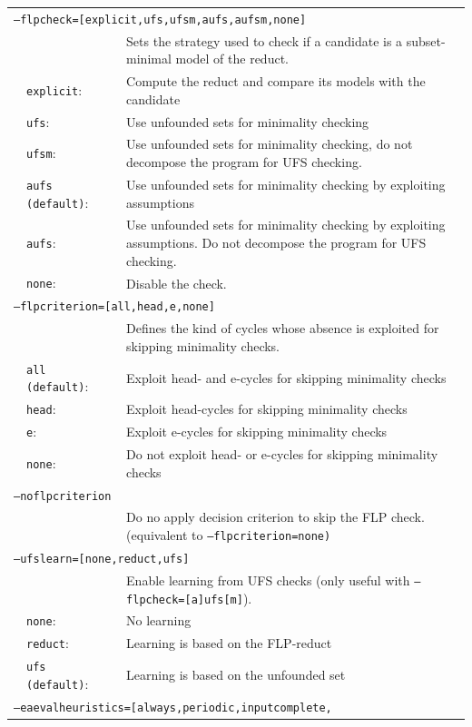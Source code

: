 \documentclass[a4paper, titlepage]{article}
\begin{document}
\begin{center}
\begin{longtable}{p{0.7cm}  p{2.2cm} p{0.3cm} p{6.3cm}  }
\multicolumn{4}{l}{\texttt{--flpcheck=[explicit,ufs,ufsm,aufs,aufsm,none]}}\\
& & &Sets the strategy used to check if a candidate is a subset-minimal model of the reduct.\\
&\texttt{explicit}:&&Compute the reduct and compare its models with the candidate\\
&\texttt{ufs}:&&Use unfounded sets for minimality checking
\\
&\texttt{ufsm}:&&Use unfounded sets for minimality checking, do not decompose the program for UFS checking.\\
&\texttt{aufs (default)}:&&Use unfounded sets for minimality checking by exploiting assumptions\\
&\texttt{aufs}:&&Use unfounded sets for minimality checking by exploiting assumptions. Do not decompose the program for UFS checking.\\
&\texttt{none}:&&Disable the check.\\
\multicolumn{4}{l}{\texttt{--flpcriterion=[all,head,e,none]}}\\
& & & Defines the kind of cycles whose absence is exploited for skipping minimality checks.\\
&\texttt{all (default)}:&&Exploit head- and e-cycles for skipping minimality checks\\
&\texttt{head}:&& Exploit head-cycles for skipping minimality checks\\
&\texttt{e}:&&Exploit e-cycles for skipping minimality checks\\
&\texttt{none}:&& Do not exploit head- or e-cycles for skipping minimality checks\\
\multicolumn{4}{l}{\texttt{--noflpcriterion}}\\
& & & Do no apply decision criterion to skip the FLP check. (equivalent to \texttt{--flpcriterion=none)}\\
\multicolumn{4}{l}{\texttt{--ufslearn=[none,reduct,ufs]}}\\
& & & Enable learning from UFS checks (only useful with \texttt{--flpcheck=[a]ufs[m]}).\\
&\texttt{none}:&&No learning\\
&\texttt{reduct}:&&Learning is based on the FLP-reduct\\
&\texttt{ufs (default)}:&&Learning is based on the unfounded set\\
\multicolumn{4}{l}{\texttt{--eaevalheuristics=[always,periodic,inputcomplete,}}\\

\end{longtable}
\end{center}
\end{document}
